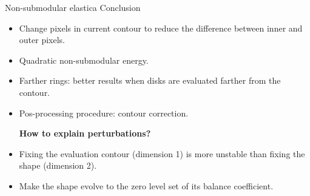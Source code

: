 \begin{frame}
{Non-submodular elastica}
{Conclusion}

\begin{itemize}
\item{Change pixels in current contour to reduce the difference between inner and outer pixels.}
\item{Quadratic non-submodular energy.}
\pause
\item{Farther rings: better results when disks are evaluated farther from the contour. }
\pause
\item{Pos-processing procedure: contour correction. }
\pause\vspace{1em}

\textbf{How to explain perturbations?}

\item{Fixing the evaluation contour (dimension 1) is more unstable than fixing the shape (dimension 2).}
\item{Make the shape evolve to the zero level set of its balance coefficient.}
\end{itemize}
\end{frame}


